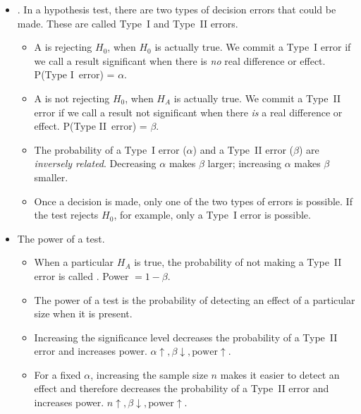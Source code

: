 \begin{itemize}
\item {}.  In a hypothesis test, there are two types of decision errors that could be made.  These are called Type~I and Type~II errors. \vspace{-1mm}
\begin{itemize}
\item A  is rejecting $H_0$, when $H_0$ is actually true.  We commit a Type~I error if we call a result significant when there is \emph{no} real difference or effect.  P(Type I~error) = $\alpha$.
\item A  is not rejecting $H_0$, when $H_A$ is actually true.  We commit a Type~II error if we call a result not significant when there \emph{is} a real difference or effect.  P(Type II~error) = $\beta$.
\item The probability of a Type~I error ($\alpha$) and a Type~II error ($\beta$) are \emph{inversely related}. Decreasing $\alpha$ makes $\beta$ larger; increasing $\alpha$ makes $\beta$ smaller.  
\item Once a decision is made, only one of the two types of errors is possible.  If the test rejects $H_0$, for example, only a Type~I error is possible.
\end{itemize}
\item The power of a test.
\begin{itemize}\vspace{-1mm}
\setlength{\itemsep}{0mm}
\item When a particular $H_A$ is true, the probability of not making a Type~II error is called .  Power $= 1 - \beta$.  
\item The power of a test is the probability of detecting an effect of a particular size when it is present.
\item Increasing the significance level decreases the probability of a Type~II error and increases power.  $\alpha \uparrow, \beta \downarrow, \text{power} \uparrow$.  
\item For a fixed $\alpha$, increasing the sample size $n$ makes it easier to detect an effect and therefore decreases the probability of a Type~II error and increases power.   $n \uparrow, \beta \downarrow, \text{power} \uparrow$.


\end{itemize}
\end{itemize}


{}

